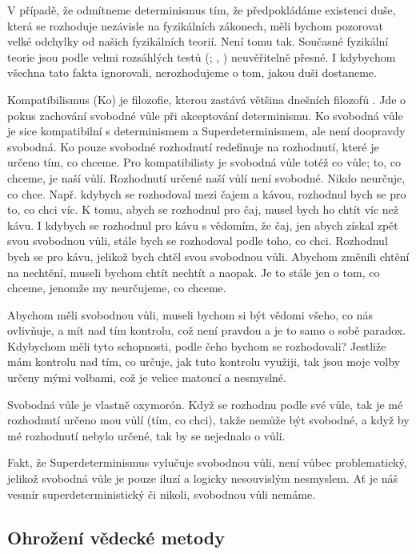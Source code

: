 V případě, že odmítneme determinismus tím, že předpokládáme existenci duše, která se rozhoduje nezávisle na fyzikálních zákonech, měli bychom pozorovat velké odchylky od našich fyzikálních teorií. Není tomu tak. Současné fyzikální teorie jsou podle velmi rozsáhlých testů (\cite{GenRelAcc}; , \cite*{QEDAcc}) neuvěřitelně přesné. I kdybychom všechna tato fakta ignorovali, nerozhodujeme o tom, jakou duši dostaneme.

Kompatibilismus (Ko) je filozofie, kterou zastává většina dnešních filozofů \parencite{FWSur}. Jde o pokus zachování svobodné vůle při akceptování determinismu. Ko svobodná vůle je sice kompatibilní s determinismem a Superdeterminismem, ale není doopravdy svobodná. Ko pouze svobodné rozhodnutí redefinuje na rozhodnutí, které je určeno tím, co chceme. Pro kompatibilisty je svobodná vůle totéž co vůle; to, co chceme, je naší vůlí. Rozhodnutí určené naší vůlí není svobodné. Nikdo neurčuje, co chce. Např. kdybych se rozhodoval mezi čajem a kávou, rozhodnul bych se pro to, co chci víc. K tomu, abych se rozhodnul pro čaj, musel bych ho chtít víc než kávu. I kdybych se rozhodnul pro kávu s vědomím, že  čaj, jen abych získal zpět svou svobodnou vůli, stále bych se rozhodoval podle toho, co chci. Rozhodnul bych se pro kávu, jelikož bych chtěl  svou svobodnou vůli. Abychom změnili chtění na nechtění, museli bychom chtít nechtít a naopak. Je to stále jen o tom, co chceme, jenomže my neurčujeme, co chceme.

Abychom měli svobodnou vůli, museli bychom si být vědomi všeho, co nás ovlivňuje, a mít nad tím kontrolu, což není pravdou a je to samo o sobě paradox. Kdybychom měli tyto schopnosti, podle čeho bychom se rozhodovali? Jestliže mám kontrolu nad tím, co určuje, jak tuto kontrolu využiji, tak jsou moje volby určeny mými volbami, což je velice matoucí a nesmyslné.

Svobodná vůle je vlastně oxymorón. Když se rozhodnu podle své vůle, tak je mé rozhodnutí určeno mou vůlí (tím, co chci), takže nemůže být svobodné, a když by mé rozhodnutí nebylo určené, tak by se nejednalo o vůli.

Fakt, že Superdeterminismus vylučuje svobodnou vůli, není vůbec problematický, jelikož svobodná vůle je pouze iluzí a logicky nesouvislým nesmyslem. Ať je náš vesmír superdeterministický či nikoli, svobodnou vůli nemáme.

\clearpage

\subsection{Ohrožení vědecké metody}

